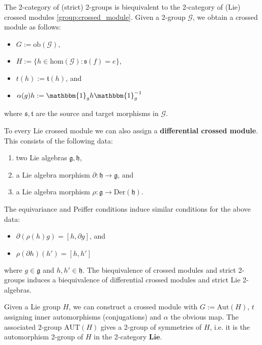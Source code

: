     \begin{property}
        The 2-category of (strict) 2-groups is biequivalent to the 2-category of (Lie) crossed modules \ref{group:crossed_module}. Given a 2-group $\mathcal{G}$, we obtain a crossed module as follows:
        \begin{itemize}
            \item $G:=\text{ob}(\mathcal{G})$,
            \item $H:=\{h\in\text{hom}(\mathcal{G}):\mathfrak{s}(f)=e\}$,
            \item $t(h):=\mathfrak{t}(h)$, and
            \item $\alpha(g)h := \mathbbm{1}_gh\mathbbm{1}_g^{-1}$
        \end{itemize}
        where $\mathfrak{s},\mathfrak{t}$ are the source and target morphisms in $\mathcal{G}$.

        To every Lie crossed module we can also assign a \textbf{differential crossed module}. This consists of the following data:
        \begin{enumerate}
            \item two Lie algebras $\mathfrak{g},\mathfrak{h}$,
            \item a Lie algebra morphism $\partial:\mathfrak{h}\rightarrow\mathfrak{g}$, and
            \item a Lie algebra morphism $\rho:\mathfrak{g}\rightarrow\text{Der}(\mathfrak{h})$.
        \end{enumerate}
        The equivariance and Peiffer conditions induce similar conditions for the above data:
        \begin{itemize}
            \item $\partial(\rho(h)g) = [h,\partial g]$, and
            \item $\rho(\partial h)(h') = [h,h']$
        \end{itemize}
        where $g\in\mathfrak{g}$ and $h,h'\in\mathfrak{h}$. The biequivalence of crossed modules and strict 2-groups induces a biequivalence of differential crossed modules and strict Lie 2-algebras.
    \end{property}

    \begin{example}
        Given a Lie group $H$, we can construct a crossed module with $G:=\text{Aut}(H)$, $t$ assigning inner automorphisms (conjugations) and $\alpha$ the obvious map. The associated 2-group $\text{AUT}(H)$ gives a 2-group of symmetries of $H$, i.e. it is the automorphism 2-group of $H$ in the 2-category $\mathbf{Lie}$.
    \end{example}

